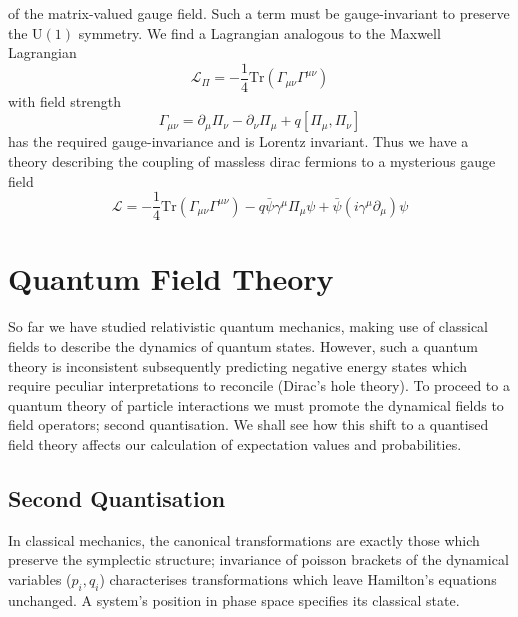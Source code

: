 \documentclass[11pt, a4paper]{article}
\theoremstyle{definition}
\theoremstyle{plain}
\begin{document}
of the matrix-valued gauge field. Such a term must be gauge-invariant to preserve
the $\mathrm{U}(1)$ symmetry. We find a Lagrangian analogous to the Maxwell Lagrangian
\begin{equation}
  \mathcal{L}_\Pi = - \frac{1}{4}\mathrm{Tr}(\Gamma_{\mu\nu}\Gamma^{\mu\nu})
\end{equation}
with field strength
\begin{equation}
  \Gamma_{\mu\nu} = \partial_\mu\Pi_\nu - \partial_\nu\Pi_\mu +q[\Pi_\mu, \Pi_\nu]
\end{equation}
has the required gauge-invariance and is Lorentz invariant.
Thus we have a theory describing the coupling
of massless dirac fermions to a mysterious gauge field
\begin{equation}
  \mathcal{L} =  - \frac{1}{4}\mathrm{Tr}(\Gamma_{\mu\nu}\Gamma^{\mu\nu}) 
  - q\bar{\psi}\gamma^\mu\Pi_\mu\psi
  + \bar{\psi}(i\gamma^\mu \partial_\mu)\psi
\end{equation}


\section{Quantum Field Theory}

So far we have studied relativistic quantum mechanics, making use of classical
fields to describe the dynamics of quantum states. However, such a quantum theory is
inconsistent subsequently predicting negative energy states which require 
peculiar interpretations to reconcile (Dirac's hole theory). To proceed to a
quantum theory of particle interactions we must promote the dynamical fields
to field operators; second quantisation. We shall see how this shift to
a quantised field theory affects our calculation of expectation values and probabilities.


\subsection{Second Quantisation}
In classical mechanics, the canonical transformations are exactly those which preserve the symplectic 
structure; invariance of poisson brackets of the dynamical variables ($p_i, q_i$) characterises
transformations which leave Hamilton's equations unchanged.
A system's position in phase space specifies its classical state.
\end{document}
